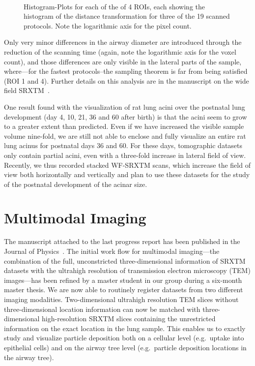 \documentclass[a4paper,twoside,DIV=calc]{scrartcl}
\newif\ifhtml
\newcommand{\imsize}{\linewidth}
\begin{document}
\renewcommand{\imsize}{0.5\linewidth}
\begin{figure}[htp]
	\centering
	\ifhtml
	\else
		\\%
	\fi
	\caption{Histogram-Plots for each of the of 4 ROIs, each showing the histogram of the distance transformation for three of the 19 scanned protocols. Note the logarithmic axis for the pixel count.}%
	\label{fig:DTFplots}
\end{figure}

Only very minor differences in the airway diameter are introduced through the reduction of the scanning time (again, note the logarithmic axis for the voxel count), and those differences are only visible in the lateral parts of the sample, where---for the fastest protocols--the sampling theorem is far from being satisfied (ROI 1 and 4). Further details on this analysis are in the manuscript on the wide field SRXTM~\cite{Haberthuer2010}.

One result found with the visualization of rat lung acini over the postnatal lung development (day 4, 10, 21, 36 and 60 after birth) is that the acini seem to grow to a greater extent than predicted. Even if we have increased the visible sample volume nine-fold, we are still not able to enclose and fully visualize an entire rat lung acinus for postnatal days 36 and 60. For these days, tomographic datasets only contain partial acini, even with a three-fold increase in lateral field of view. Recently, we thus recorded stacked WF-SRXTM scans, which increase the field of view both horizontally and vertically and plan to use these datasets for the study of the postnatal development of the acinar size.

\section{Multimodal Imaging}
The manuscript attached to the last progress report has been published in the Journal of Physics~\cite{Haberthuer2009}. The initial work flow for multimodal imaging---the combination of the full, unconstricted three-dimensional information of SRXTM datasets with the ultrahigh resolution of transmission electron microscopy (TEM) images---has been refined by a master student in our group during a six-month master thesis. We are now able to routinely register datasets from two different imaging modalities. Two-dimensional ultrahigh resolution TEM slices without three-dimensional location information can now be matched with three-dimensional high-resolution SRXTM slices containing the unrestricted information on the exact location in the lung sample. This enables us to exactly study and visualize particle deposition both on a cellular level (e.g.\, uptake into epithelial cells) and on the airway tree level (e.g.~particle deposition locations in the airway tree).
\end{document}
